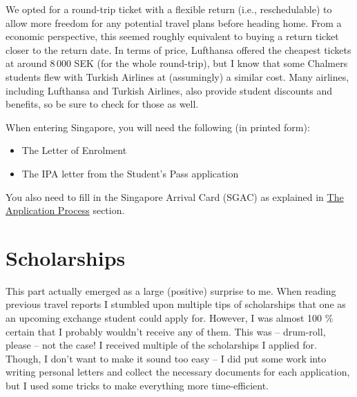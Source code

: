 We opted for a round-trip ticket with a flexible return (i.e., reschedulable) to allow more freedom for any potential travel plans before heading home. From a economic perspective, this seemed roughly equivalent to buying a return ticket closer to the return date. In terms of price, Lufthansa offered the cheapest tickets at around 8\,000 SEK (for the whole round-trip), but I know that some Chalmers students flew with Turkish Airlines at (assumingly) a similar cost. Many airlines, including Lufthansa and Turkish Airlines, also provide student discounts and benefits, so be sure to check for those as well.

\hrulefill

When entering Singapore, you will need the following (in printed form):
\begin{itemize}
    \item The Letter of Enrolment
    \item The IPA letter from the Student's Pass application
\end{itemize}
You also need to fill in the Singapore Arrival Card (SGAC) as explained in \hyperref[app]{The Application Process} section.
\section*{Scholarships}
This part actually emerged as a large (positive) surprise to me. When reading previous travel reports I stumbled upon multiple tips of scholarships that one as an upcoming exchange student could apply for. However, I was almost 100 \% certain that I probably wouldn't receive any of them. This was -- drum-roll, please -- not the case! I received multiple of the scholarships I applied for. Though, I don't want to make it sound too easy -- I did put some work into writing personal letters and collect the necessary documents for each application, but I used some tricks to make everything more time-efficient.

